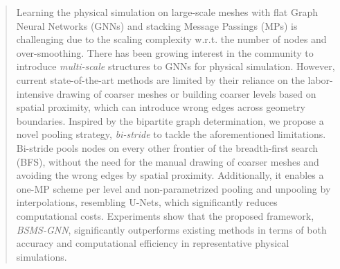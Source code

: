 \begin{abstract}
    Learning the physical simulation on large-scale meshes with flat Graph Neural Networks (GNNs) and stacking Message Passings (MPs) is challenging due to the scaling complexity w.r.t. the number of nodes and over-smoothing.
    There has been growing interest in the community to introduce \textit{multi-scale} structures to GNNs for physical simulation.
    However, current state-of-the-art methods are limited by their reliance on the labor-intensive drawing of coarser meshes or building coarser levels based on spatial proximity, which can introduce wrong edges across geometry boundaries.
    Inspired by the bipartite graph determination, we propose a novel pooling strategy, \textit{bi-stride} to tackle the aforementioned limitations.  Bi-stride pools nodes on every other frontier of the breadth-first search (BFS), without the need for the manual drawing of coarser meshes and avoiding the wrong edges by spatial proximity. Additionally, it enables a one-MP scheme per level and non-parametrized pooling and unpooling by interpolations, resembling U-Nets, which significantly reduces computational costs. Experiments show that the proposed framework, \textit{BSMS-GNN}, significantly outperforms existing methods in terms of both accuracy and computational efficiency in representative physical simulations.
\end{abstract}